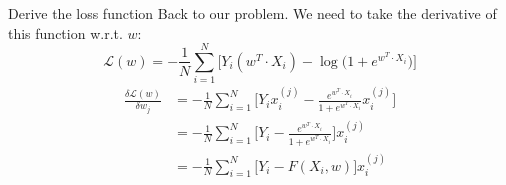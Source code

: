 \bgroup
\begin{frame}{Derive the loss function}
Back to our problem. We need to take the derivative of this function w.r.t. $w$:
\begin{equation*}
\mathcal{L}(w) = -\frac{1}{N} \sum_{i=1}^N \bigg[Y_i(w^T\cdot X_i) - \log\bigg(1+e^{w^T\cdot X_i}\bigg)\bigg]
\end{equation*}
\begin{align*}
\frac{\delta \mathcal{L}(w)}{\delta w_j} &= -\frac{1}{N} \sum_{i=1}^N \bigg[Y_ix_i^{(j)} - \frac{e^{w^T\cdot X_i}}{1 + e^{w^T\cdot X_i}}x_i^{(j)}\bigg]\\
&=- \frac{1}{N} \sum_{i=1}^N \bigg[Y_i - \frac{e^{w^T\cdot X_i}}{1 + e^{w^T\cdot X_i}}\bigg]x_i^{(j)}\\
&=- \frac{1}{N} \sum_{i=1}^N \bigg[Y_i - F(X_i, w)\bigg]x_i^{(j)}
\end{align*}
\end{frame}
\egroup
